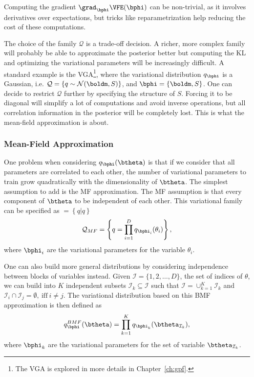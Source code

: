 Computing the gradient $\grad_{\bphi}\VFE(\bphi)$ can be non-trivial, as it involves derivatives over expectations, but tricks like reparametrization \cite{titsiasDoublyStochasticVariational} help reducing the cost of these computations.

The choice of the family $\mathcal{Q}$ is a trade-off decision.
A richer, more complex family will probably be able to approximate the posterior better but computing the \ac{KL} and optimizing the variational parameters will be increasingly difficult.
A standard example is the \ac{VGA}\footnote{The \ac{VGA} is explored in more details in Chapter~\ref{ch:gpf}.}, where the variational distribution $q_{\bphi}$ is a Gaussian, i.e. $\mathcal{Q} = \left\{q \sim \mathcal{N}(\boldm, S)\right\}$, and $\bphi = \{\boldm, S\}$.
One can decide to restrict $\mathcal{Q}$ further by specifying the structure of $S$.
Forcing it to be diagonal will simplify a lot of computations and avoid inverse operations, but all correlation information in the posterior will be completely lost.
This is what the mean-field approximation is about.

\subsubsection{Mean-Field Approximation}

One problem when considering $q_{\bphi}(\btheta)$ is that if we consider that all parameters are correlated to each other, the number of variational parameters to train grow quadratically with the dimensionality of $\btheta$.
The simplest assumption to add is the \ac{MF} approximation.
The \ac{MF} assumption is that every component of $\btheta$ to be independent of each other.
This variational family can be specified as $ = \left\{q | q \right\}$
\begin{align}
    \mathcal{Q}_{MF}= \left\{q = \prod_{i=1}^D q_{\bphi_i}(\theta_i)\right\},
\end{align}
where $\bphi_i$ are the variational parameters for the variable $\theta_i$.

One can also build more general distributions by considering independence between blocks of variables instead.
Given $\mathcal{I}=\{1,2,\ldots,D\}$, the set of indices of $\theta$, we can build into $K$ independent subsets $\mathcal{I}_k \subseteq \mathcal{I}$ such that  $\mathcal{I} = \cup_{k=1}^K \mathcal{I}_{k}$ and $\mathcal{I}_i \cap \mathcal{I}_j=\emptyset,~\mathrm{iff}~i \neq j$.
The variational distribution based on this \ac{BMF} approximation is then defined as
\begin{align}
    q^{BMF}_{\bphi}(\btheta) = \prod_{k=1}^K q_{\bphi_k}(\btheta_{\mathcal{I}_k}),
\end{align}
where $\bphi_k$ are the variational parameters for the set of variable $\btheta_{\mathcal{I}_k}$.

